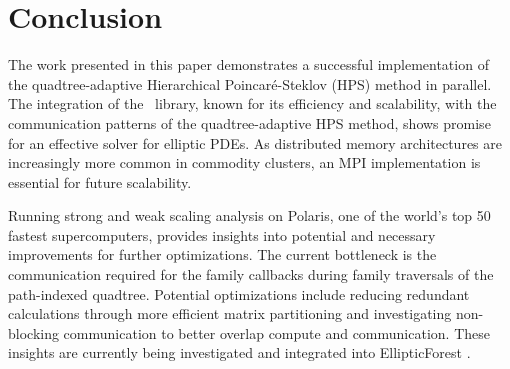 \section{Conclusion}

The work presented in this paper demonstrates a successful implementation of the quadtree-adaptive Hierarchical Poincaré-Steklov (HPS) method in parallel. The integration of the \pforest\ library, known for its efficiency and scalability, with the communication patterns of the quadtree-adaptive HPS method, shows promise for an effective solver for elliptic PDEs. As distributed memory architectures are increasingly more common in commodity clusters, an MPI implementation is essential for future scalability.

Running strong and weak scaling analysis on Polaris, one of the world's top 50 fastest supercomputers, provides insights into potential and necessary improvements for further optimizations. The current bottleneck is the communication required for the family callbacks during family traversals of the path-indexed quadtree. Potential optimizations include reducing redundant calculations through more efficient matrix partitioning and investigating non-blocking communication to better overlap compute and communication. These insights are currently being investigated and integrated into EllipticForest \citep{chipman2024ellipticforest}.